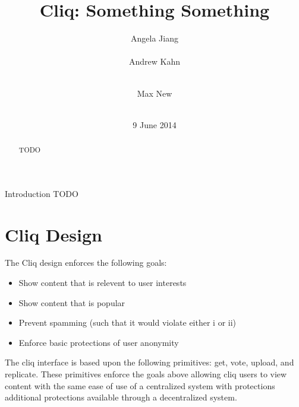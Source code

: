 \documentclass{sig-alternate}
\begin{document}
\nocite{*}


\title{Cliq: Something Something}


\author{
\alignauthor Angela Jiang\\
  \\
\alignauthor Andrew Kahn\\
  \\
\and
\alignauthor Max New\\
  \\
}

\date{9 June 2014}

\maketitle
\begin{abstract}
  TODO
\end{abstract}
\begin{section}{Introduction}
  TODO
\end{section}
\section{Cliq Design}

The Cliq design enforces the following goals: 

\begin{itemize}
\item Show content that is relevent to user interests
\item Show content that is popular
\item Prevent spamming (such that it would violate either i or ii)
\item Enforce basic protections of user anonymity
\end{itemize}

The cliq interface is based upon the following primitives: get, vote, upload, and replicate. 
These primitives enforce the goals above allowing cliq users to view content with the same ease of use of a centralized system with protections additional protections available through a decentralized system. 
\end{document}
